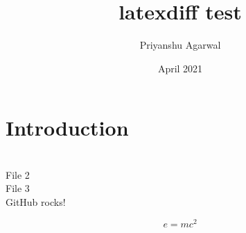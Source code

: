 \documentclass{article}
\title{latexdiff test}
\author{Priyanshu Agarwal}
\date{April 2021}
\begin{document}
\maketitle

\section{Introduction}

\\File 2
\\File 3
\\GitHub rocks!

\begin{equation}
    e = mc^2
\end{equation}
\end{document}
